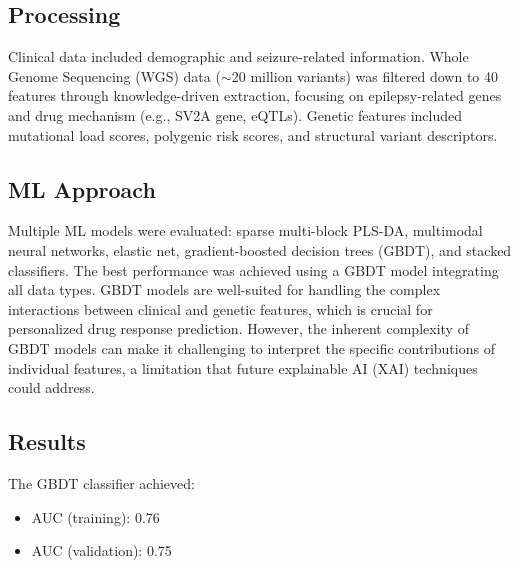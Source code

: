 \subsection*{Processing}
Clinical data included demographic and seizure-related information. Whole Genome Sequencing (WGS) data ($\sim$20 million variants) was filtered down to 40 features through knowledge-driven extraction, focusing on epilepsy-related genes and drug mechanism (e.g., SV2A gene, eQTLs). Genetic features included mutational load scores, polygenic risk scores, and structural variant descriptors.

\subsection*{ML Approach}
Multiple ML models were evaluated: sparse multi-block PLS-DA, multimodal neural networks, elastic net, gradient-boosted decision trees (GBDT), and stacked classifiers. The best performance was achieved using a GBDT model integrating all data types. GBDT models are well-suited for handling the complex interactions between clinical and genetic features, which is crucial for personalized drug response prediction. However, the inherent complexity of GBDT models can make it challenging to interpret the specific contributions of individual features, a limitation that future explainable AI (XAI) techniques could address.

\subsection*{Results}
The GBDT classifier achieved:
\begin{itemize}
    \item AUC (training): 0.76
    \item AUC (validation): 0.75
\end{itemize}

